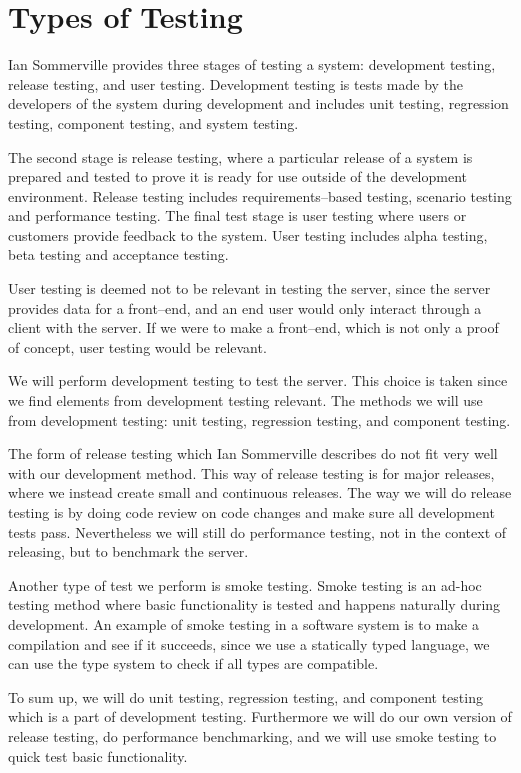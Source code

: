 \section{Types of Testing}
Ian Sommerville provides three stages of testing a system\cite[p.~231]{software_engineering}:
development testing, release testing, and user testing.
Development testing is tests made by the developers of the system during development
and includes unit testing, regression testing, component testing,
and system testing\cite[p.~232]{software_engineering}.

The second stage is release testing,
where a particular release of a system is prepared and tested to prove it is ready for use outside of the development environment\cite[p.~245]{software_engineering}.
Release testing includes requirements--based testing, scenario testing and performance testing.
The final test stage is user testing where users or customers provide feedback to the system.\cite[p.~249]{software_engineering}
User testing includes alpha testing, beta testing and acceptance testing.

User testing is deemed not to be relevant in testing the server,
since the server provides data for a front--end,
and an end user would only interact through a client with the server.
If we were to make a front--end, which is not only a proof of concept, user testing would be relevant.

We will perform development testing to test the server.
This choice is taken since we find elements from development testing relevant.
The methods we will use from development testing:
unit testing, regression testing, and component testing.

The form of release testing which Ian Sommerville describes do not fit very well with our development method.
This way of release testing is for major releases, where we instead create small and continuous releases.
The way we will do release testing is by doing code review on code changes and make sure all development tests pass.
Nevertheless we will still do performance testing, not in the context of releasing, but to benchmark the server.

\bigskip

Another type of test we perform is smoke testing.
Smoke testing is an ad-hoc testing method where basic functionality is tested and happens naturally during development\cite{smoke_testing}.
An example of smoke testing in a software system is to make a compilation and see if it succeeds, since we use a statically typed language,
we can use the type system to check if all types are compatible.

To sum up, we will do unit testing, regression testing, and component testing which is a part of development testing.
Furthermore we will do our own version of release testing, do performance benchmarking,
and we will use smoke testing to quick test basic functionality.
